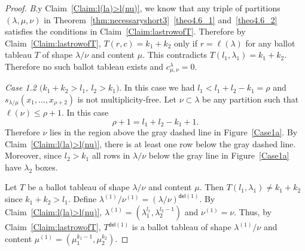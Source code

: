 \documentclass[10pt]{article}
\theoremstyle{definition}
\newcommand{\del}{\mathsf{del}}
\let\hypertargeta\hypertarget %
\newenvironment{Case}[1]{\par\vskip2pt\noindent%
\emph{#1}.}{\vskip2pt}
\begin{document}
\begin{proof}
\begin{Case}
By Claim~\ref{Claim:l(la)>l(nu)}, we know that any triple of partitions $(\lambda,\mu,\nu)$ in Theorem~\ref{thm:necessaryshort3}~\ref{theo4.6_1} and~\ref{theo4.6_2} satisfies the conditions in Claim~\ref{Claim:lastrowofT}. Therefore by Claim~\ref{Claim:lastrowofT}, $T(r,c) = k_1+k_2$ only if $r = \ell(\lambda)$ for any ballot tableau $T$ of shape $\lambda/\nu$ and content $\mu$. This contradicts $T(l_1,\lambda_1) = k_1+k_2$. Therefore no such ballot tableau exists and $c^{\lambda}_{\mu,\nu} = 0$.

\end{Case}

\begin{Case}
{\hypertargeta{theo4.6_case1.2}{Case 1.2} $(k_1+k_2 > l_1$, $l_2>k_1)$} 
In this case we had $l_1<l_1+l_2-k_1=\rho$ and $s_{\lambda/\mu}(x_1,\ldots,x_{\rho+2})$ is not multiplicity-free. Let $\nu\subset \lambda$ be any partition such that $\ell(\nu) \leq \rho+1$. In this case
\begin{equation}
\label{eq:case1.2rho}
\rho+1 = l_1+l_2-k_1 + 1.
\end{equation}
Therefore $\nu$ lies in the region above the gray dashed line in Figure~\ref{Case1a}. By Claim~\ref{Claim:l(la)>l(nu)}, there is at least one row below the gray dashed line. Moreover, since $l_2 > k_1$ all rows in $\lambda/\nu$ below the gray line in Figure~\ref{Case1a} have $\lambda_2$ boxes. 

Let $T$ be a ballot tableau of shape $\lambda/\nu$ and content $\mu$. Then $T(l_1,\lambda_1)\neq k_1+k_2$ since $k_1+k_2 > l_1$. Define $\lambda^{(1)}/ \nu^{(1)} = (\lambda / \nu)^{\del (1)}$. By Claim~\ref{Claim:l(la)>l(nu)}, $\lambda^{(1)} = (\lambda_1^{l_1},\lambda_2^{l_2-1})$ and $\nu^{(1)} = \nu$. Thus, by Claim~\ref{Claim:lastrowofT}, $T^{\del (1)}$ is a ballot tableau of shape $\lambda^{(1)}/\nu$ and content $\mu^{(1)} = (\mu_1^{k_1-1},\mu_2^{k_2})$.



\end{Case}
\end{proof}
\end{document}
